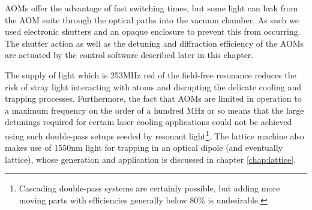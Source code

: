 	AOMs offer the advantage of fast switching times, but some light can leak from the AOM suite through the optical paths into the vacuum chamber.
	As such we used electronic shutters and an opaque enclosure to prevent this from occurring.
	The shutter action as well as the detuning and diffraction efficiency of the AOMs are actuated by the control software described later in this chapter.
	
	The supply of light which is 253MHz red of the field-free resonance reduces the risk of stray light interacting with atoms and disrupting the delicate cooling and trapping processes.
	Furthermore, the fact that AOMs are limited in operation to a maximum frequency on the order of a hundred MHz or so means that the large detunings required for certain laser cooling applications could not be achieved using such double-pass setups seeded by resonant light\footnote{Cascading double-pass systems are certainly possible, but adding more moving parts with efficiencies generally below 80\% is undesirable.}.
	The lattice machine also makes use of 1550nm light for trapping in an optical dipole (and eventually lattice), whose generation and application is discussed in chapter \ref{chap:lattice}.	


	
	

